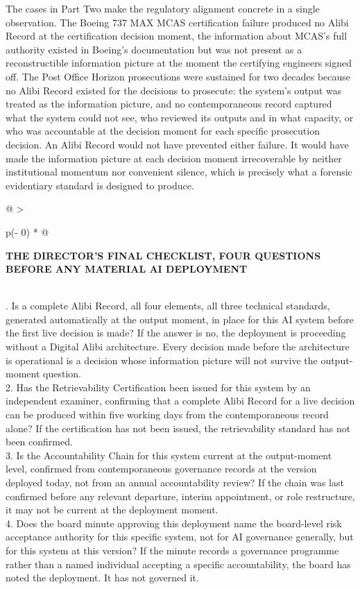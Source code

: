 The cases in Part Two make the regulatory alignment concrete in a single observation. The Boeing 737 MAX MCAS certification failure produced no Alibi Record at the certification decision moment, the information about MCAS's full authority existed in Boeing's documentation but was not present as a reconstructible information picture at the moment the certifying engineers signed off. The Post Office Horizon prosecutions were sustained for two decades because no Alibi Record existed for the decisions to prosecute: the system's output was treated as the information picture, and no contemporaneous record captured what the system could not see, who reviewed its outputs and in what capacity, or who was accountable at the decision moment for each specific prosecution decision. An Alibi Record would not have prevented either failure. It would have made the information picture at each decision moment irrecoverable by neither institutional momentum nor convenient silence, which is precisely what a forensic evidentiary standard is designed to produce.

\begin{longtable}[]{@{}
  >{\raggedright\arraybackslash}p{(\columnwidth - 0\tabcolsep) * }@{}}
\toprule\noalign{}
\begin{minipage}[b]{\linewidth}\raggedright
\textbf{THE DIRECTOR'S FINAL CHECKLIST, FOUR QUESTIONS BEFORE ANY MATERIAL AI DEPLOYMENT}
\end{minipage} \\
\midrule\noalign{}
\endhead
\bottomrule\noalign{}
. Is a complete Alibi Record, all four elements, all three technical standards, generated automatically at the output moment, in place for this AI system before the first live decision is made? If the answer is no, the deployment is proceeding without a Digital Alibi architecture. Every decision made before the architecture is operational is a decision whose information picture will not survive the output-moment question. \\
2. Has the Retrievability Certification been issued for this system by an independent examiner, confirming that a complete Alibi Record for a live decision can be produced within five working days from the contemporaneous record alone? If the certification has not been issued, the retrievability standard has not been confirmed. \\
3. Is the Accountability Chain for this system current at the output-moment level, confirmed from contemporaneous governance records at the version deployed today, not from an annual accountability review? If the chain was last confirmed before any relevant departure, interim appointment, or role restructure, it may not be current at the deployment moment. \\
4. Does the board minute approving this deployment name the board-level risk acceptance authority for this specific system, not for AI governance generally, but for this system at this version? If the minute records a governance programme rather than a named individual accepting a specific accountability, the board has noted the deployment. It has not governed it. \\
\end{longtable}

